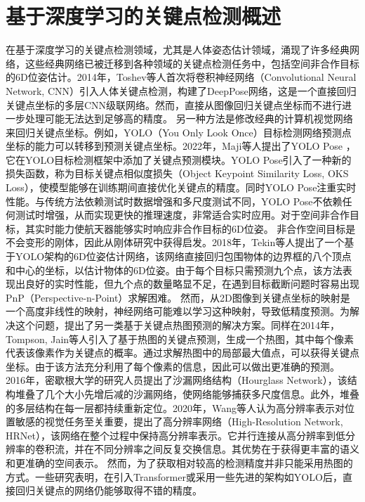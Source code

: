 \section{基于深度学习的关键点检测概述}
在基于深度学习的关键点检测领域，尤其是人体姿态估计领域，涌现了许多经典网络，这些经典网络已被迁移到各种领域的关键点检测任务中，包括空间非合作目标的6D位姿估计。2014年，Toshev等人首次将卷积神经网络（Convolutional Neural Network, CNN）引入人体关键点检测，构建了DeepPose网络，这是一个直接回归关键点坐标的多层CNN级联网络\citep{toshev2014deeppose}。然而，直接从图像回归关键点坐标而不进行进一步处理可能无法达到足够高的精度。
另一种方法是修改经典的计算机视觉网络来回归关键点坐标。例如，YOLO（You Only Look Once）目标检测网络预测点坐标的能力可以转移到预测关键点坐标。2022年，Maji等人提出了YOLO Pose \citep{yolo_pose}，它在YOLO目标检测框架中添加了关键点预测模块。YOLO Pose引入了一种新的损失函数，称为目标关键点相似度损失（Object Keypoint Similarity Loss, OKS Loss），使模型能够在训练期间直接优化关键点的精度。同时YOLO Pose注重实时性能。与传统方法依赖测试时数据增强和多尺度测试不同，YOLO Pose不依赖任何测试时增强，从而实现更快的推理速度，非常适合实时应用。对于空间非合作目标，其实时能力使航天器能够实时响应非合作目标的6D位姿。
非合作空间目标是不会变形的刚体，因此从刚体研究中获得启发。2018年，Tekin等人提出了一个基于YOLO架构的6D位姿估计网络，该网络直接回归包围物体的边界框的八个顶点和中心的坐标，以估计物体的6D位姿\citep{tekin2018real}。由于每个目标只需预测九个点，该方法表现出良好的实时性能，但九个点的数量略显不足，在遇到目标截断问题时容易出现PnP（Perspective-n-Point）求解困难。
然而，从2D图像到关键点坐标的映射是一个高度非线性的映射，神经网络可能难以学习这种映射，导致低精度预测。为解决这个问题，提出了另一类基于关键点热图预测的解决方案。同样在2014年，Tompson, Jain等人引入了基于热图的关键点预测，生成一个热图，其中每个像素代表该像素作为关键点的概率\citep{tompson2014joint}。通过求解热图中的局部最大值点，可以获得关键点坐标。由于该方法充分利用了每个像素的信息，因此可以做出更准确的预测。
2016年，密歇根大学的研究人员提出了沙漏网络结构（Hourglass Network）\citep{newell2016stacked}，该结构堆叠了几个大小先增后减的沙漏网络，使网络能够捕获多尺度信息。此外，堆叠的多层结构在每一层都持续重新定位。2020年，Wang等人认为高分辨率表示对位置敏感的视觉任务至关重要，提出了高分辨率网络（High-Resolution Network, HRNet）\citep{wang2020deep}，该网络在整个过程中保持高分辨率表示。它并行连接从高分辨率到低分辨率的卷积流，并在不同分辨率之间反复交换信息。其优势在于获得更丰富的语义和更准确的空间表示。
然而，为了获取相对较高的检测精度并非只能采用热图的方式。一些研究表明\citep{mao2022poseur, 10394434, lu2024ksl}，在引入Transformer或采用一些先进的架构如YOLO后，直接回归关键点的网络仍能够取得不错的精度。


